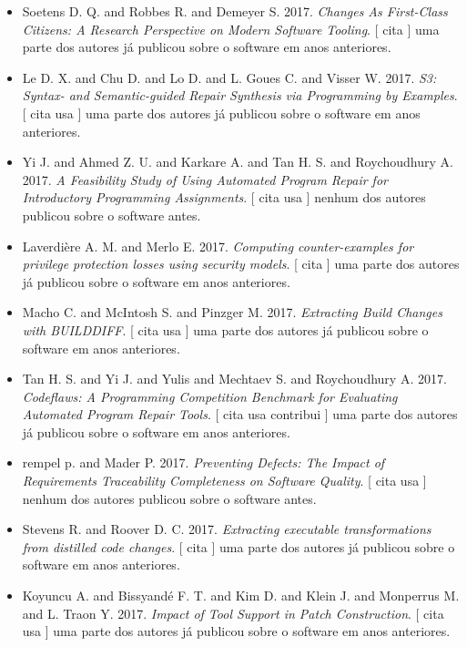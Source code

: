 \begin{itemize}
\item Soetens D. Q. and Robbes R. and Demeyer S.
      2017.
        \textit{ Changes As First-Class Citizens: A Research Perspective on Modern Software Tooling}.
      [
          cita
      ]
uma parte dos autores já publicou sobre o software em anos anteriores.
\item Le D. X. and Chu D. and Lo D. and L. Goues C. and Visser W.
      2017.
        \textit{ S3: Syntax- and Semantic-guided Repair Synthesis via Programming by Examples}.
      [
          cita
          usa
      ]
uma parte dos autores já publicou sobre o software em anos anteriores.
\item Yi J. and Ahmed Z. U. and Karkare A. and Tan H. S. and Roychoudhury A.
      2017.
        \textit{ A Feasibility Study of Using Automated Program Repair for Introductory Programming Assignments}.
      [
          cita
          usa
      ]
nenhum dos autores publicou sobre o software antes.
\item Laverdière A. M. and Merlo E.
      2017.
        \textit{ Computing counter-examples for privilege protection losses using security models}.
      [
          cita
      ]
uma parte dos autores já publicou sobre o software em anos anteriores.
\item Macho C. and McIntosh S. and Pinzger M.
      2017.
        \textit{ Extracting Build Changes with BUILDDIFF}.
      [
          cita
          usa
      ]
uma parte dos autores já publicou sobre o software em anos anteriores.
\item Tan H. S. and Yi J. and Yulis and Mechtaev S. and Roychoudhury A.
      2017.
        \textit{ Codeflaws: A Programming Competition Benchmark for Evaluating Automated Program Repair Tools}.
      [
          cita
          usa
          contribui
      ]
uma parte dos autores já publicou sobre o software em anos anteriores.
\item rempel p. and Mader P.
      2017.
        \textit{ Preventing Defects: The Impact of Requirements Traceability Completeness on Software Quality}.
      [
          cita
          usa
      ]
nenhum dos autores publicou sobre o software antes.
\item Stevens R. and Roover D. C.
      2017.
        \textit{ Extracting executable transformations from distilled code changes}.
      [
          cita
      ]
uma parte dos autores já publicou sobre o software em anos anteriores.
\item Koyuncu A. and Bissyand{\'e} F. T. and Kim D. and Klein J. and Monperrus M. and L. Traon Y.
      2017.
        \textit{ Impact of Tool Support in Patch Construction}.
      [
          cita
          usa
      ]
uma parte dos autores já publicou sobre o software em anos anteriores.
\end{itemize}

